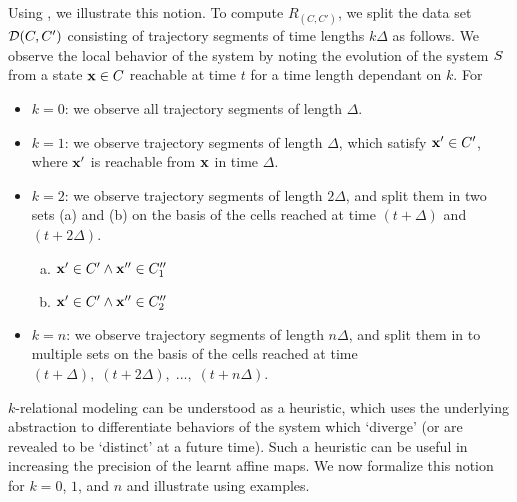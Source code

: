 Using , we illustrate this notion. To compute
$R_{(C,C')}$, we
split the data set $\mathcal{D}(C,C')$ consisting of trajectory segments of time lengths
$k\Delta$ as follows.  We observe the local behavior of the system by
noting the evolution of the system $S$ from a state $\mathbf{x} \in C$
reachable at time $t$ for a time length dependant on $k$. For
\begin{itemize}
    \item{$k=0$}: we observe all trajectory segments of length $\Delta$.
    \item{$k=1$}: we observe trajectory segments of length $\Delta$,
        which satisfy $\mathbf{x}'\in C'$, where $\mathbf{x}'$ is reachable from
        $\mathbf{x}$ in time $\Delta$.
    \item{$k=2$}: we observe trajectory segments of length $2\Delta$,
        and split them in two sets (a) and (b) on the basis of the
        cells reached at time $(t+\Delta)$ and $(t+2\Delta)$.
        \begin{enumerate}[(a)]
            \item $\mathbf{x}' \in C' \land \mathbf{x}''\in C''_1$
            \item $\mathbf{x}' \in C' \land \mathbf{x}'' \in C''_2$
        \end{enumerate}
    \item{$k=n$}: we observe trajectory segments of length $n\Delta$,
        and split them in to multiple sets on the basis of the cells
        reached at time $(t+\Delta),\; (t+2\Delta),\;
        \ldots,\;(t+n\Delta)$.
\end{itemize}

$k$-relational modeling can be understood as a heuristic, which uses
the underlying abstraction to differentiate behaviors of the system
which `diverge' (or are revealed to be `distinct' at a future time).
Such a heuristic can be useful in increasing the precision of the
learnt affine maps.  We now formalize this notion for $k=0$, $1$, and
$n$ and illustrate using examples.


